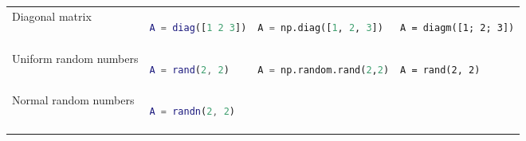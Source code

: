 \documentclass[10pt, landscape]{article}
\begin{document}
\begin{multicols}{2}
\begin{tabular}[]{@{}llll@{}}
\begin{minipage}[t]{0.24\columnwidth}
Diagonal matrix\strut
\end{minipage} & \begin{minipage}[t]{0.20\columnwidth}\raggedright\strut
\begin{lstlisting}[language=Matlab]
A = diag([1 2 3])
\end{lstlisting}
\strut
\end{minipage} & \begin{minipage}[t]{0.25\columnwidth}\raggedright\strut
\begin{lstlisting}[language=Python]
A = np.diag([1, 2, 3])
\end{lstlisting}
\strut
\end{minipage} & \begin{minipage}[t]{0.20\columnwidth}\raggedright\strut
\begin{lstlisting}
A = diagm([1; 2; 3])
\end{lstlisting}
\strut
\end{minipage}\tabularnewline
\begin{minipage}[t]{0.24\columnwidth}\raggedright\strut
Uniform random numbers\strut
\end{minipage} & \begin{minipage}[t]{0.20\columnwidth}\raggedright\strut
\begin{lstlisting}[language=Matlab]
A = rand(2, 2)
\end{lstlisting}
\strut
\end{minipage} & \begin{minipage}[t]{0.25\columnwidth}\raggedright\strut
\begin{lstlisting}[language=Python]
A = np.random.rand(2,2)
\end{lstlisting}
\strut
\end{minipage} & \begin{minipage}[t]{0.20\columnwidth}\raggedright\strut
\begin{lstlisting}
A = rand(2, 2)
\end{lstlisting}
\strut
\end{minipage}\tabularnewline
\begin{minipage}[t]{0.24\columnwidth}\raggedright\strut
Normal random numbers\strut
\end{minipage} & \begin{minipage}[t]{0.20\columnwidth}\raggedright\strut
\begin{lstlisting}[language=Matlab]
A = randn(2, 2)
\end{lstlisting}
\strut
\end{minipage} & \begin{minipage}[t]{0.25\columnwidth}\raggedright\strut

\end{minipage}
\end{tabular}
\end{multicols}
\end{document}
